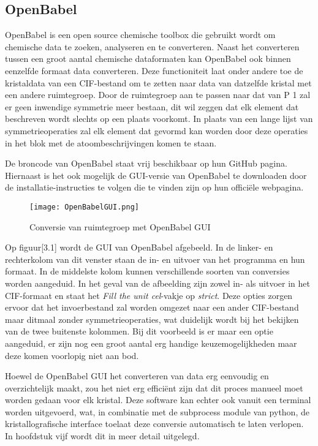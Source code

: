 \subsection{OpenBabel}
OpenBabel is een open source chemische toolbox die gebruikt wordt om chemische data te zoeken, analyseren en te converteren.\citep*{OBAB1} Naast het converteren tussen een groot aantal chemische dataformaten kan OpenBabel ook binnen eenzelfde formaat data converteren. Deze functioniteit laat onder andere toe de kristaldata van een CIF-bestand om te zetten naar data van datzelfde kristal met een andere ruimtegroep. Door de ruimtegroep aan te passen naar dat van P 1 zal er geen inwendige symmetrie meer bestaan, dit wil zeggen dat elk element dat beschreven wordt slechts op een plaats voorkomt. In plaats van een lange lijst van symmetrieoperaties zal elk element dat gevormd kan worden door deze operaties in het blok met de atoombeschrijvingen komen te staan.   
\par
De broncode van OpenBabel staat vrij beschikbaar op hun GitHub pagina.  Hiernaast is het ook mogelijk de GUI-versie van OpenBabel te downloaden door de installatie-instructies te volgen die te vinden zijn op hun officiële webpagina.\citep*{OBAB1}   
\par
\begin{figure}[h]
\texttt{[image: OpenBabelGUI.png]}
\caption{Conversie van ruimtegroep met OpenBabel GUI}
\end{figure}
\par
Op figuur[3.1] wordt de GUI van OpenBabel afgebeeld. In de linker- en rechterkolom van dit venster staan de in- en uitvoer van het programma en hun formaat. In de middelste kolom kunnen verschillende soorten van conversies worden aangeduid. In het geval van de afbeelding zijn zowel in- als uitvoer in het CIF-formaat en staat het \textit{Fill the unit cel}-vakje op \textit{strict}. Deze opties zorgen ervoor dat het invoerbestand zal worden omgezet naar een ander CIF-bestand maar ditmaal zonder symmetrieoperaties, wat duidelijk wordt bij het bekijken van de twee buitenste kolommen. Bij dit voorbeeld is er maar een optie aangeduid, er zijn nog een groot aantal erg handige keuzemogelijkheden maar deze komen voorlopig niet aan bod.
\par
Hoewel de OpenBabel GUI het converteren van data erg eenvoudig en overzichtelijk maakt, zou het niet erg efficiënt zijn dat dit proces manueel moet worden gedaan voor elk kristal. Deze software kan echter ook vanuit een terminal worden uitgevoerd, wat, in combinatie met de subprocess module van python, de kristallografische interface toelaat deze conversie automatisch te laten verlopen. In hoofdstuk vijf wordt dit in meer detail uitgelegd.
\par     
